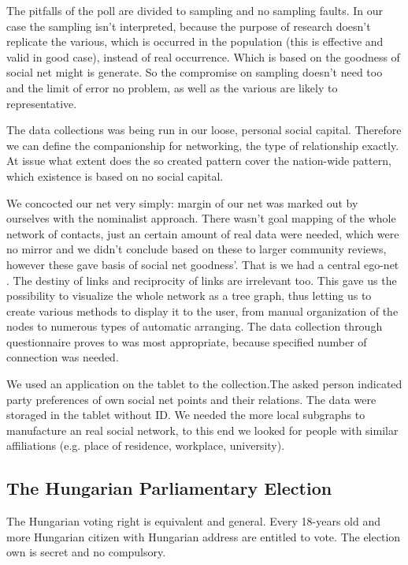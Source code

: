 \documentclass[journal]{IEEEtran}
\begin{document}
The pitfalls of the poll are divided to sampling and no sampling faults. In our case the sampling isn’t interpreted, because the purpose of research doesn’t replicate the various, which is occurred in the population (this is effective and valid in good case), instead of  real occurrence. Which is based on the goodness of social net might is generate.
So the compromise on sampling doesn’t need too and the limit of error no problem, as well as the various are likely to representative. 

The data collections was being run in our loose, personal social capital. Therefore we can define the companionship for networking, the type of relationship exactly. 
At issue what extent does the so created pattern cover the nation-wide pattern, which existence is based on no social capital.

We concocted our net very simply: margin of our net was marked out by ourselves with the nominalist approach. There wasn’t goal mapping of  the whole network of contacts, just an certain amount of real data were needed, which were no mirror and we didn’t conclude based on these to larger community reviews, however these gave basis of social net goodness’. That is we had a central ego-net  \cite{kurtosi}. The destiny of links and reciprocity of links are irrelevant too. This gave us the possibility to visualize the whole network as a tree graph, thus letting us to create various methods to display it to the user, from manual organization of the nodes to numerous types of automatic arranging.
The data collection through questionnaire proves to was most appropriate, because specified  number of connection was needed.

We used an application on the tablet to the collection.The asked person indicated party preferences of own social net points and their relations.  The data were storaged in the tablet without ID.
We needed the more local subgraphs to manufacture an real social network, to this end we looked for people with similar affiliations (e.g. place of residence, workplace, university).

\subsection{The Hungarian Parliamentary Election}

The Hungarian voting right is equivalent and general. Every 18-years old and more Hungarian citizen with Hungarian address are entitled to vote. The election own is secret and no compulsory.
\end{document}
